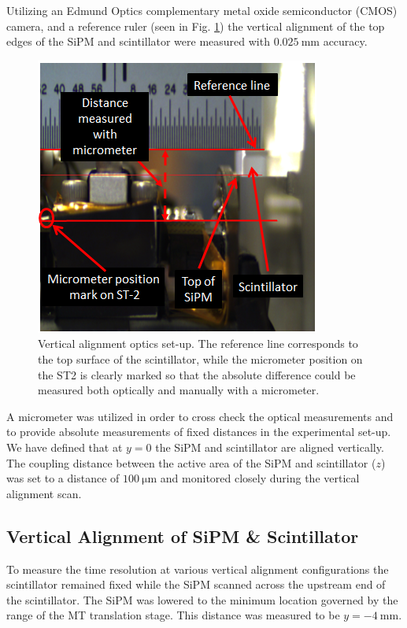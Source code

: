 Utilizing an Edmund Optics complementary metal oxide semiconductor (CMOS) camera, and a reference ruler (seen in Fig. \ref{fig:sipm_va_optics}) the vertical alignment of the top edges of the SiPM and scintillator were measured with $\mathrm{0.025~mm}$ accuracy.
	\begin{figure}[!htb]
		\centering
		\includegraphics[width=0.8\columnwidth]{misalignment/figs/sipm_va_optics}
		\caption{Vertical alignment optics set-up.  The reference line corresponds to the top surface of the scintillator, while the micrometer position on the ST2 is clearly marked so that the absolute difference could be measured both optically and manually with a micrometer.}
		\label{fig:sipm_va_optics}
	\end{figure}
A micrometer was utilized in order to cross check the optical measurements and to provide absolute measurements of fixed distances in the experimental set-up.  We have defined that at $y = 0$ the SiPM and scintillator are aligned vertically.  The coupling distance between the active area of the SiPM and scintillator ($z$) was set to a distance of $\mathrm{100\ \mu m}$ and monitored closely during the vertical alignment scan.

\subsection{Vertical Alignment of SiPM \& Scintillator}
\label{sec:misalign_vert}

To measure the time resolution at various vertical alignment configurations the scintillator remained fixed while the SiPM scanned across the upstream end of the scintillator. The SiPM was lowered to the minimum location governed by the range of the MT translation stage.  This distance was measured to be $y = \mathrm{-4~mm}$.  

